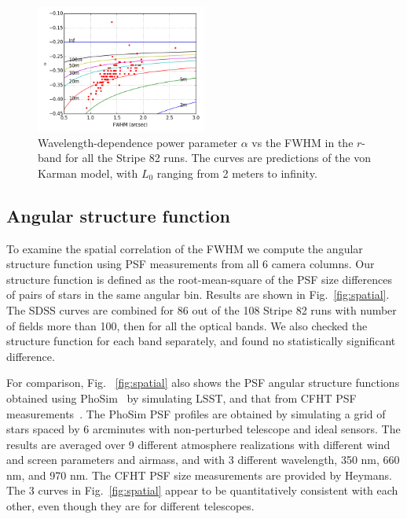 \begin{figure}
\centering
\includegraphics[width=0.5\textwidth]{FIGURES/alpha_fwhm.png}
\caption{Wavelength-dependence power parameter $\alpha$ vs the
  FWHM in the $r$-band for all the Stripe 82 runs. 
The curves are predictions of the von Karman
  model, with $L_0$ ranging from 2 meters to infinity.
\label{fig:alpha_fwhm}}
\end{figure}



\subsection{Angular structure function} 

To examine the spatial correlation of the FWHM we compute the angular
structure function using PSF measurements from all 6 camera columns.
Our structure function is defined as
the root-mean-square of the PSF size differences of pairs of stars
in the same angular bin. 
Results are shown in Fig.~\ref{fig:spatial}.
The SDSS curves are combined for 86 out of the 108 Stripe 82 runs with number of
fields more than 100, then for all
the optical bands. We also checked the structure function for each band
separately, and found no statistically significant difference.

For comparison, Fig. ~\ref{fig:spatial} also shows the PSF angular
structure functions obtained using PhoSim~\citep{phosim} by simulating LSST,
and that from CFHT PSF measurements~\citep{heymans2012}.
The PhoSim PSF profiles are obtained by simulating a grid of stars
spaced by 6 arcminutes with non-perturbed telescope and ideal sensors.
The results are averaged over 9 different atmosphere realizations with
different wind and screen parameters and airmass, and with 3 different
wavelength, 350 nm, 660 nm, and 970 nm.
The CFHT PSF size measurements are provided by Heymans.
The 3 curves in Fig.~\ref{fig:spatial} appear to be quantitatively
consistent with each other, even though they are for different telescopes.


